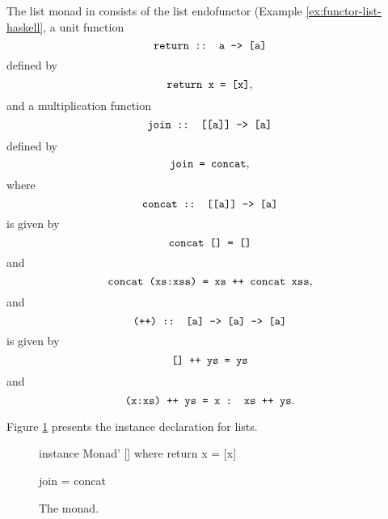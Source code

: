 \begin{example}
  \label{ex:monad-list-haskell}

  The list monad in \hask consists of the list endofunctor (Example
  \ref{ex:functor-list-haskell}, a unit function
  \begin{equation*}
    \text{\texttt{return :: a -> [a]}}
  \end{equation*}
  defined by
  \begin{equation}
    \label{eq:list-return}
    \text{\texttt{return x = [x]}}
    \text{,}
  \end{equation}
  and a multiplication function
  \begin{equation*}
    \text{\texttt{join :: [[a]] -> [a]}}
  \end{equation*}
  defined by
  \begin{equation}
    \label{eq:list-join}
    \text{\texttt{join = concat}}
    \text{,}
  \end{equation}
  where
  \begin{equation*}
    \text{\texttt{concat :: [[a]] -> [a]}}
  \end{equation*}
  is given by
  \begin{equation}
    \label{eq:list-concat-nil}
    \text{\texttt{concat [] = []}}
  \end{equation}
  and
  \begin{equation}
    \label{eq:list-concat-cons}
    \text{\texttt{concat (xs:xss) = xs ++ concat xss}}
    \text{,}
  \end{equation}
  and
  \begin{equation*}
    \text{\texttt{(++) :: [a] -> [a] -> [a]}}
  \end{equation*}
  is given by
  \begin{equation}
    \text{\texttt{[] ++ ys = ys}}
  \end{equation}
  and
  \begin{equation}
    \text{\texttt{(x:xs) ++ ys = x : xs ++ ys}}
    \text{.}
  \end{equation}

  Figure \ref{fig:monad-list-haskell} presents the instance
  declaration for lists.
  \begin{figure}[htbp]
    \begin{codehaskell}
instance Monad' [] where
  return x = [x]

  join = concat
    \end{codehaskell}
    \caption{The \texthaskell{[]} monad.}
    \label{fig:monad-list-haskell}
  \end{figure}


\end{example}
